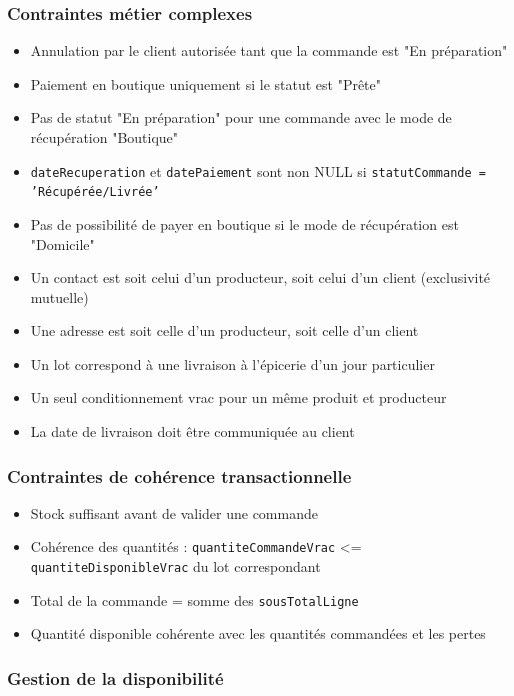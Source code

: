 \subsubsection{Contraintes métier complexes}

\begin{itemize}
    \item Annulation par le client autorisée tant que la commande est "En préparation"
    \item Paiement en boutique uniquement si le statut est "Prête"
    \item Pas de statut "En préparation" pour une commande avec le mode de récupération "Boutique"
    \item \texttt{dateRecuperation} et \texttt{datePaiement} sont non NULL si \texttt{statutCommande = 'Récupérée/Livrée'}
    \item Pas de possibilité de payer en boutique si le mode de récupération est "Domicile"
    \item Un contact est soit celui d'un producteur, soit celui d'un client (exclusivité mutuelle)
    \item Une adresse est soit celle d'un producteur, soit celle d'un client
    \item Un lot correspond à une livraison à l'épicerie d'un jour particulier
    \item Un seul conditionnement vrac pour un même produit et producteur
    \item La date de livraison doit être communiquée au client
\end{itemize}

\subsubsection{Contraintes de cohérence transactionnelle}

\begin{itemize}
    \item Stock suffisant avant de valider une commande
    \item Cohérence des quantités : \texttt{quantiteCommandeVrac} <= \texttt{quantiteDisponibleVrac} du lot correspondant
    \item Total de la commande = somme des \texttt{sousTotalLigne}
    \item Quantité disponible cohérente avec les quantités commandées et les pertes
\end{itemize}

\subsubsection{Gestion de la disponibilité}

